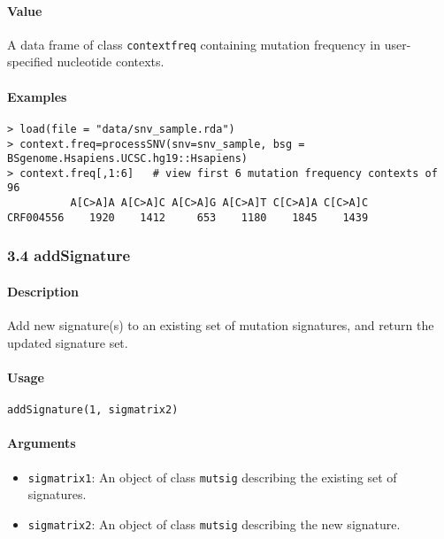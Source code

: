 \documentclass[]{article}
\providecommand{\tightlist}{%
  \setlength{\itemsep}{0pt}\setlength{\parskip}{0pt}}
\let\oldparagraph\paragraph
\renewcommand{\paragraph}[1]{\oldparagraph{#1}\mbox{}}
\begin{document}
\hypertarget{contextfreq}{\paragraph{\texorpdfstring{\textbf{Value}}{Value}}\label{contextfreq}}

A data frame of class \texttt{contextfreq} containing mutation frequency
in user-specified nucleotide contexts.

\paragraph{\texorpdfstring{\textbf{Examples}}{Examples}}\label{examples-2}

\begin{verbatim}
> load(file = "data/snv_sample.rda")
> context.freq=processSNV(snv=snv_sample, bsg = BSgenome.Hsapiens.UCSC.hg19::Hsapiens)
> context.freq[,1:6]   # view first 6 mutation frequency contexts of 96
          A[C>A]A A[C>A]C A[C>A]G A[C>A]T C[C>A]A C[C>A]C
CRF004556    1920    1412     653    1180    1845    1439
\end{verbatim}

\subsubsection{3.4 addSignature}\label{addsignature}

\paragraph{\texorpdfstring{\textbf{Description}}{Description}}\label{description-3}

Add new signature(s) to an existing set of mutation signatures, and
return the updated signature set.

\paragraph{\texorpdfstring{\textbf{Usage}}{Usage}}\label{usage-3}

\texttt{addSignature(1,\ sigmatrix2)}

\paragraph{\texorpdfstring{\textbf{Arguments
}}{Arguments }}\label{mutsig}

\begin{itemize}
\tightlist
\item
  \texttt{sigmatrix1}: An object of class \texttt{mutsig} describing the
  existing set of signatures.
\item
  \texttt{sigmatrix2}: An object of class \texttt{mutsig} describing the
  new signature.
\end{itemize}
\end{document}
